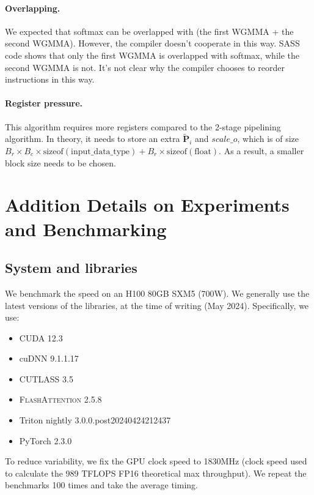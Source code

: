 \documentclass{article}
\newcommand{\vP}{\mathbf{P}}
\newcommand{\fa}{\textsc{FlashAttention}\xspace}
\begin{document}
\paragraph{Overlapping.} 
We expected that softmax can be overlapped with (the first WGMMA + the second WGMMA). However, the compiler doesn't cooperate in this way.
SASS code shows that only the first WGMMA is overlapped with softmax, while the second WGMMA is not. It's not clear why the compiler chooses to reorder instructions in this way.

\paragraph{Register pressure.}
This algorithm requires more registers compared to the 2-stage pipelining algorithm. 
In theory, it needs to store an extra $\tilde{\vP}_{i}$ and $scale\_o$, which is of size $B_r \times B_c \times \text{sizeof}(\text{input\_data\_type}) + B_r \times \text{sizeof}(\text{float})$.
As a result, a smaller block size needs to be chosen.


\section{Addition Details on Experiments and Benchmarking}

\subsection{System and libraries}
\label{sec:system}

We benchmark the speed on an H100 80GB SXM5 (700W).
We generally use the latest versions of the libraries, at the time of writing
(May 2024).
Specifically, we use:
\begin{itemize}
\item CUDA 12.3
\item cuDNN 9.1.1.17
\item CUTLASS 3.5
\item \fa 2.5.8
\item Triton nightly 3.0.0.post20240424212437
\item PyTorch 2.3.0
\end{itemize}

To reduce variability, we fix the GPU clock speed to 1830MHz (clock speed used
to calculate the 989 TFLOPS FP16 theoretical max throughput).
We repeat the benchmarks 100 times and take the average timing.
\end{document}
